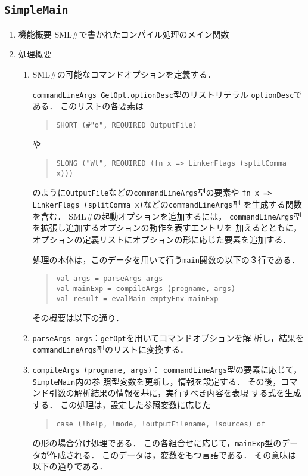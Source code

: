 \documentclass{jbook}
\newcommand{\smlsharp}{SML\#}
\newcommand{\code}[1]{\mbox{\large\tt #1}}
\newenvironment{program}{\begin{quote}\begin{tt}}%
                        {\end{tt}\end{quote}}
\begin{document}
\subsection{\code{SimpleMain}}
\begin{enumerate}
\item 機能概要 \smlsharp{}で書かれたコンパイル処理のメイン関数
\item 処理概要 
\begin{enumerate}
\item \smlsharp{}の可能なコマンドオプションを定義する．

	\code{commandLineArgs GetOpt.optionDesc}型のリストリテラル
\code{optionDesc}である．
	このリストの各要素は
\begin{program}
\code{SHORT (\#"o", REQUIRED OutputFile)}
\end{program}
や
\begin{program}
\code{SLONG ("Wl", REQUIRED (fn x => LinkerFlags (splitComma x)))}
\end{program}
のように\code{OutputFile}などの\code{commandLineArgs}型の要素や
\code{fn x => LinkerFlags (splitComma x)}などの\code{commandLineArgs}型
を生成する関数を含む．
	\smlsharp{}の起動オプションを追加するには，
\code{commandLineArgs}型を拡張し追加するオプションの動作を表すエントリを
加えるとともに，オプションの定義リストにオプションの形に応じた要素を追加する．

処理の本体は，このデータを用いて行う\code{main}関数の以下の３行である．
\begin{program}
\code{val args = parseArgs args}\\
\code{val mainExp = compileArgs (progname, args)}\\
\code{val result = evalMain emptyEnv mainExp}
\end{program}
その概要は以下の通り．

\item \code{parseArgs args}：\code{getOpt}を用いてコマンドオプションを解
析し，結果を\code{commandLineArgs}型のリストに変換する．
\item \code{compileArgs (progname, args)}：
	\code{commandLineArgs}型の要素に応じて，\code{SimpleMain}内の参
照型変数を更新し，情報を設定する．
	その後，コマンド引数の解析結果の情報を基に，実行すべき内容を表現
する式を生成する．
	この処理は，設定した参照変数に応じた
\begin{program}
\code{case (!help, !mode, !outputFilename, !sources) of}
\end{program}
の形の場合分け処理である．
	この各組合せに応じて，\code{mainExp}型のデータが作成される．
	このデータは，変数をもつ言語である．
	その意味は以下の通りである．


\end{enumerate}
\end{enumerate}
\end{document}
